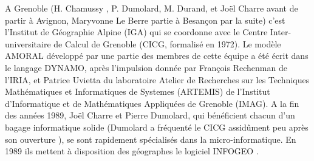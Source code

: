 
A Grenoble (H. Chamussy , P. Dumolard, M. Durand, et Joël Charre avant de partir à Avignon, Maryvonne Le Berre partie à Besançon par la suite) c’est l’Institut de Géographie Alpine (IGA) qui se coordonne avec le Centre Inter-universitaire de Calcul de Grenoble (CICG, formalisé en 1972). Le modèle AMORAL développé par une partie des membres de cette équipe a été écrit dans le langage DYNAMO, après l'impulsion donnée par François Rechenman de l'IRIA, et Patrice Uvietta du laboratoire Atelier de Recherches sur les Techniques Mathématiques et Informatiques de Systemes (ARTEMIS) de l’Institut d'Informatique et de Mathématiques Appliquées de Grenoble (IMAG). A la fin des années 1989, Joël Charre et Pierre Dumolard, qui bénéficient chacun d'un bagage informatique solide (Dumolard a fréquenté le CICG assidûment peu après son ouverture \autocite[323]{Cuyala2014}), se sont rapidement spécialisés dans la micro-informatique. En 1989 ils mettent à disposition des géographes le logiciel INFOGEO \autocites{Charre1989,Theriault1989,Ferrier1991}.  %

